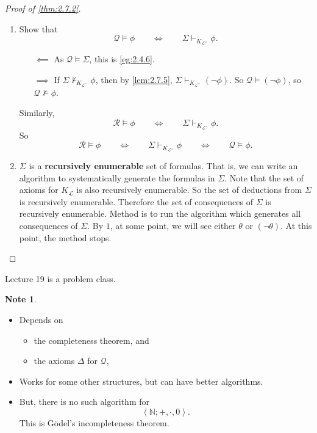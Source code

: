 \documentclass{article}
\newcommand{\N}{\mathbb{N}}
\renewcommand{\L}{\mathcal{L}}
\newcommand{\rb}[1]{\left( #1 \right)}
\newcommand{\ab}[1]{\left\langle #1 \right\rangle}
\newcommand{\notb}[1]{\rb{\neg #1}}
\theoremstyle{definition}\newtheorem{definition}{Definition}[subsection]
\theoremstyle{definition}\newtheorem{remark1}[definition]{Remark}
\theoremstyle{definition}\newtheorem{example1}[definition]{Example}
\theoremstyle{definition}\newtheorem*{remark2}{Remark}
\theoremstyle{definition}\newtheorem*{example2}{Example}
\theoremstyle{definition}\newtheorem*{note}{Note}
\theoremstyle{definition}\newtheorem*{notation}{Notation}
\begin{document}
\begin{proof}[Proof of \ref{thm:2.7.2}]
\hfill
\begin{enumerate}
\item Show that
$$ \mathcal{Q} \vDash \phi \qquad \iff \qquad \Sigma \vdash_{K_{\L^=}} \phi. $$
\begin{itemize}
\item[$ \impliedby $] As $ \mathcal{Q} \vDash \Sigma $, this is \ref{eg:2.4.6}.
\item[$ \implies $] If $ \Sigma \not\vdash_{K_{\L^=}} \phi $, then by \ref{lem:2.7.5}, $ \Sigma \vdash_{K_{\L^=}} \notb{\phi} $. So $ \mathcal{Q} \vDash \notb{\phi} $, so $ \mathcal{Q} \not\vDash \phi $.
\end{itemize}
Similarly,
$$ \mathcal{R} \vDash \phi \qquad \iff \qquad \Sigma \vdash_{K_{\L^=}} \phi. $$
So
$$ \mathcal{R} \vDash \phi \qquad \iff \qquad \Sigma \vdash_{K_{\L^=}} \phi \qquad \iff \qquad \mathcal{Q} \vDash \phi. $$
\item $ \Sigma $ is a \textbf{recursively enumerable} set of formulas. That is, we can write an algorithm to systematically generate the formulas in $ \Sigma $. Note that the set of axioms for $ K_{\L} $ is also recursively enumerable. So the set of deductions from $ \Sigma $ is recursively enumerable. Therefore the set of consequences of $ \Sigma $ is recursively enumerable. Method is to run the algorithm which generates all consequences of $ \Sigma $. By $ 1 $, at some point, we will see either $ \theta $ or $ \notb{\theta} $. At this point, the method stops.
\end{enumerate}
\end{proof}


Lecture 19 is a problem class.


\begin{note}
\hfill
\begin{itemize}
\item Depends on
\begin{itemize}
\item the completeness theorem, and
\item the axioms $ \Delta $ for $ \mathcal{Q} $,
\end{itemize}
\item Works for some other structures, but can have better algorithms.
\item But, there is no such algorithm for
$$ \ab{\N; +, \cdot, 0}. $$
This is G\"odel's incompleteness theorem.
\end{itemize}
\end{note}
\end{document}
